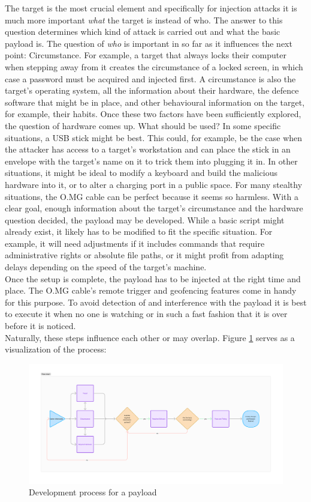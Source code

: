 The target is the most crucial element and specifically for injection attacks it is much more important \emph{what} the target is instead of who. The answer to this question determines which kind of attack is carried out and what the basic payload is. The question of \emph{who} is important in so far as it influences the next point: Circumstance. For example, a target that always locks their computer when stepping away from it creates the circumstance of a locked screen, in which case a password must be acquired and injected first. A circumstance is also the target's operating system, all the information about their hardware, the defence software that might be in place, and other behavioural information on the target, for example, their habits. Once these two factors have been sufficiently explored, the question of hardware comes up. What should be used? In some specific situations, a USB stick might be best. This could, for example, be the case when the attacker has access to a target's workstation and can place the stick in an envelope with the target's name on it to trick them into plugging it in. In other situations, it might be ideal to modify a keyboard and build the malicious hardware into it, or to alter a charging port in a public space. For many stealthy situations, the O.MG cable can be perfect because it seems so harmless. With a clear goal, enough information about the target's circumstance and the hardware question decided, the payload may be developed. While a basic script might already exist, it likely has to be modified to fit the specific situation. For example, it will need adjustments if it includes commands that require administrative rights or absolute file paths, or it might profit from adapting delays depending on the speed of the target's machine. \\
Once the setup is complete, the payload has to be injected at the right time and place. The O.MG cable's remote trigger and geofencing features come in handy for this purpose. To avoid detection of and interference with the payload it is best to execute it when no one is watching or in such a fast fashion that it is over before it is noticed.\\
Naturally, these steps influence each other or may overlap. Figure \ref{Flow Diagram Development process payload} serves as a visualization of the process:


\begin{figure}[H]
    \centering
    \includegraphics[width=1\linewidth]{visuals/attack_dev.png}
    \caption{Development process for a payload}
    \label{Flow Diagram Development process payload}
\end{figure}


